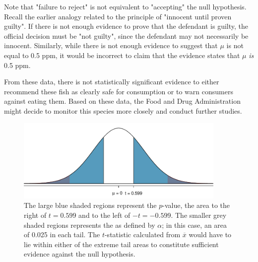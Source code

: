\begin{examplewrap}
\begin{nexample}
Note that "failure to reject" is not equivalent to "accepting" the null hypothesis. Recall the earlier analogy related to the principle of "innocent until proven guilty". If there is not enough evidence to prove that the defendant is guilty, the official decision must be "not guilty", since the defendant may not necessarily be innocent. Similarly, while there is not enough evidence to suggest that $\mu$ is not equal to 0.5 ppm, it would be incorrect to claim that the evidence states that $\mu$ \textit{is} 0.5 ppm.

From these data, there is not statistically significant evidence to either recommend these fish as clearly safe for consumption or to warn consumers against eating them. Based on these data, the Food and Drug Administration might decide to monitor this species more closely and conduct further studies. 
\end{nexample}
\end{examplewrap}
\addtocounter{footnote}{-1}%
%
\addtocounter{footnote}{1}%

\begin{figure}[h]
	\centering
	\includegraphics[width=0.9\textwidth]{ch_inference_foundations_oi_biostat/figures/pValueTuna/pValueTuna}
	\caption{The large blue shaded regions represent the $p$-value, the area to the right of $t = 0.599$ and to the left of $-t = -0.599$. The smaller grey shaded regions represents the  as defined by $\alpha$; in this case, an area of 0.025 in each tail. The $t$-statistic calculated from $\overline{x}$ would have to lie within either of the extreme tail areas to constitute sufficient evidence against the null hypothesis.}
	\label{pValueTuna}
\end{figure}

